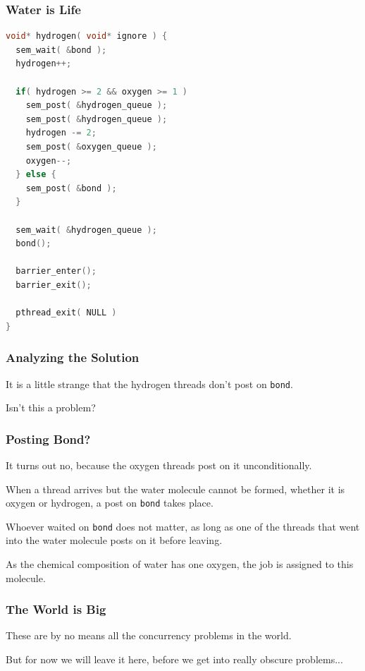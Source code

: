 \begin{frame}[fragile]
	\frametitle{Water is Life}
	\begin{lstlisting}[language=C]
void* hydrogen( void* ignore ) {
  sem_wait( &bond );
  hydrogen++;
  
  if( hydrogen >= 2 && oxygen >= 1 )
    sem_post( &hydrogen_queue );
    sem_post( &hydrogen_queue );
    hydrogen -= 2;
    sem_post( &oxygen_queue );
    oxygen--;
  } else {
    sem_post( &bond );
  }
  
  sem_wait( &hydrogen_queue );
  bond();
  
  barrier_enter();
  barrier_exit();
  
  pthread_exit( NULL )
}
\end{lstlisting}
\end{frame}


\begin{frame}
	\frametitle{Analyzing the Solution}


	It is a little strange that the hydrogen threads don't post on \texttt{bond}.

	Isn't this a problem?

\end{frame}


\begin{frame}
	\frametitle{Posting Bond?}

	It turns out no, because the oxygen threads post on it unconditionally.

	When a thread arrives but the water molecule cannot be formed, whether it is oxygen or hydrogen, a post on \texttt{bond} takes place.

	Whoever waited on \texttt{bond} does not matter, as long as one of the threads that went into the water molecule posts on it before leaving.

	As the chemical composition of water has one oxygen, the job is assigned to this molecule.

\end{frame}



\begin{frame}
	\frametitle{The World is Big}

	These are by no means all the concurrency problems in the world.

	But for now we will leave it here, before  we get into really obscure problems...

\end{frame}



